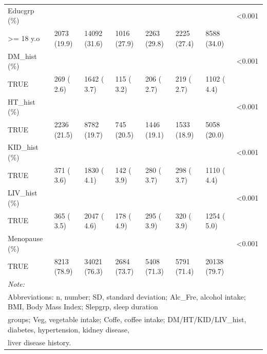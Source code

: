 \documentclass[]{tufte-handout}
\begin{document}
\begin{table}[ht]
\begin{tabular}[t]{llllllll}
Educgrp (\%) &  &  &  &  &  &  & <0.001\\
\rowcolor{gray!6}  \hspace{1em}>= 18 y.o & 2073 (19.9) & 14092 (31.6) & 1016 (27.9) & 2263 (29.8) & 2225 (27.4) & 8588 (34.0) & \\
DM\_hist (\%) &  &  &  &  &  &  & <0.001\\
\rowcolor{gray!6}  \hspace{1em}TRUE & 269 ( 2.6) & 1642 ( 3.7) & 115 ( 3.2) & 206 ( 2.7) & 219 ( 2.7) & 1102 ( 4.4) & \\
HT\_hist (\%) &  &  &  &  &  &  & <0.001\\
\rowcolor{gray!6}  \hspace{1em}TRUE & 2236 (21.5) & 8782 (19.7) & 745 (20.5) & 1446 (19.1) & 1533 (18.9) & 5058 (20.0) & \\
KID\_hist (\%) &  &  &  &  &  &  & <0.001\\
\rowcolor{gray!6}  \hspace{1em}TRUE & 371 ( 3.6) & 1830 ( 4.1) & 142 ( 3.9) & 280 ( 3.7) & 298 ( 3.7) & 1110 ( 4.4) & \\
LIV\_hist (\%) &  &  &  &  &  &  & <0.001\\
\rowcolor{gray!6}  \hspace{1em}TRUE & 365 ( 3.5) & 2047 ( 4.6) & 178 ( 4.9) & 295 ( 3.9) & 320 ( 3.9) & 1254 ( 5.0) & \\
Menopause (\%) &  &  &  &  &  &  & <0.001\\
\rowcolor{gray!6}  \hspace{1em}TRUE & 8213 (78.9) & 34021 (76.3) & 2684 (73.7) & 5408 (71.3) & 5791 (71.4) & 20138 (79.7) & \\
\bottomrule
\multicolumn{8}{l}{\textit{Note: }}\\
\multicolumn{8}{l}{Abbreviations: n, number; SD, standard deviation; Alc\_Fre, alcohol intake; BMI, Body Mass Index; Slepgrp, sleep duration}\\
\multicolumn{8}{l}{groups; Veg, vegetable intake; Coffe, coffee intake; DM/HT/KID/LIV\_hist, diabetes, hypertension, kidney disease,}\\
\multicolumn{8}{l}{liver disease history.}\\
\end{tabular}
\end{table}
\end{document}
